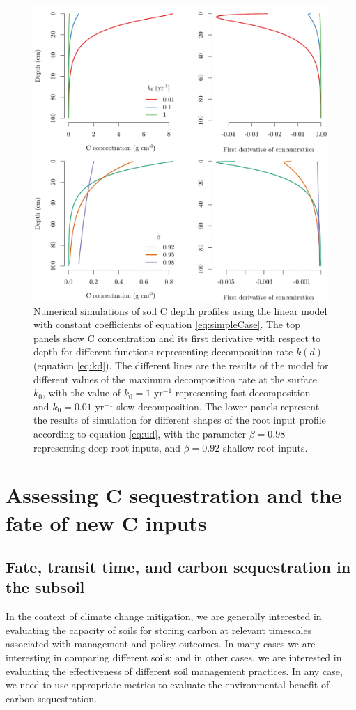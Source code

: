 \documentclass[11pt, oneside, a4paper]{article}   	%
\begin{document}
\begin{figure}[htbp]
   \centering
   \includegraphics[width=\textwidth]{Figures/rootDecomp.pdf} %
%
   \caption{Numerical simulations of soil C depth profiles using the linear model with constant coefficients of equation \ref{eq:simpleCase}. The top panels show C concentration and its first derivative with respect to depth for different functions representing decomposition rate $k(d)$ (equation \ref{eq:kd}). The different lines are the results of the model for different values of the maximum decomposition rate at the surface $k_0$, with the value of $k_0 =1$ yr$^{-1}$ representing fast decomposition and $k_0 = 0.01$ yr$^{-1}$ slow decomposition. The lower panels represent the results of simulation for different shapes of the root input profile according to equation \ref{eq:ud}, with the parameter $\beta = 0.98$ representing deep root inputs, and $\beta = 0.92$ shallow root inputs.}
   \label{fig:rootDecomp}
\end{figure}

\section{Assessing C sequestration and the fate of new C inputs}
\subsection{Fate, transit time, and carbon sequestration in the subsoil}
In the context of climate change mitigation, we are generally interested in evaluating the capacity of soils for storing carbon at relevant timescales associated with management and policy outcomes. In many cases we are interesting in comparing different soils; and in other cases, we are interested in evaluating the effectiveness of different soil management practices. In any case, we need to use appropriate metrics to evaluate the environmental benefit of carbon sequestration. 
\end{document}
